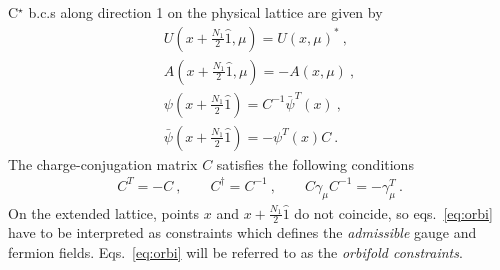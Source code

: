 \documentclass[11pt,fleqn]{article}
\begin{document}
C$^\star$ b.c.s along direction 1 on the physical lattice are given by
\begin{subequations}
   \label{eq:orbi}
   \begin{gather}
      U(x+\tfrac{N_1}{2} \hat{1},\mu) = U(x,\mu)^* \ ,
      \label{eq:orbi:SU3} \\
      A(x+\tfrac{N_1}{2} \hat{1},\mu) = -A(x,\mu) \ ,
      \label{eq:orbi:U1} \\
      \psi(x+\tfrac{N_1}{2} \hat{1}) = C^{-1} \bar{\psi}^T(x) \ ,
      \label{eq:orbi:psi} \\
      \bar{\psi}(x+\tfrac{N_1}{2} \hat{1}) = - \psi^T(x) C \ .
      \label{eq:orbi:psibar}
   \end{gather}
\end{subequations}
The charge-conjugation matrix $C$ satisfies the following conditions
\begin{gather}
   C^T = -C \ , \qquad
   C^\dag = C^{-1} \ , \qquad
   C \gamma_\mu C^{-1} = - \gamma_\mu^T \ .
\end{gather}
On the extended lattice, points $x$ and $x + \tfrac{N_1}{2} \hat{1}$ do not coincide, so eqs.~\eqref{eq:orbi} have to be interpreted as constraints which defines the \textit{admissible} gauge and fermion fields. Eqs.~\eqref{eq:orbi} will be referred to as the \textit{orbifold constraints}.
\end{document}
